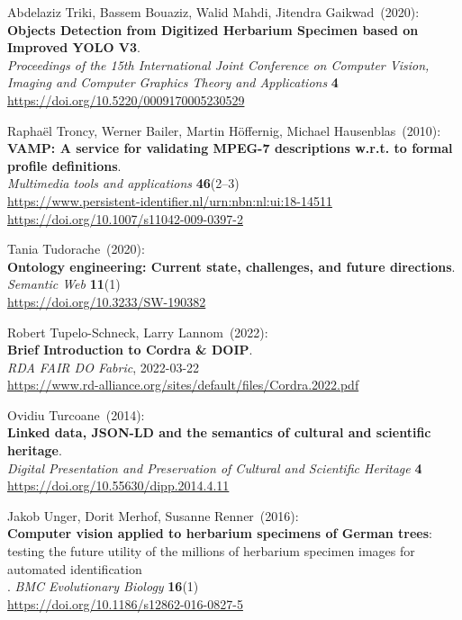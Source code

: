 \begin{thebibliography}{9}
Abdelaziz Triki, Bassem Bouaziz, Walid Mahdi, Jitendra Gaikwad~(2020): \\
\textbf{Objects Detection from Digitized Herbarium Specimen based on Improved
YOLO V3}.\\
\emph{Proceedings of the 15th International Joint Conference on Computer Vision, Imaging and Computer Graphics Theory and Applications} 
\textbf{4}\\
\url{https://doi.org/10.5220/0009170005230529}

Raphaël Troncy, Werner Bailer, Martin Höffernig, Michael Hausenblas~(2010): \\
\textbf{VAMP: A service for validating MPEG-7 descriptions w.r.t. to
formal profile definitions}.\\
\emph{Multimedia tools and applications} \textbf{46}(2--3) \\
\url{https://www.persistent-identifier.nl/urn:nbn:nl:ui:18-14511}\\
\url{https://doi.org/10.1007/s11042-009-0397-2}

Tania Tudorache~(2020): \\
\textbf{Ontology engineering: Current state, challenges, and future directions}.\\
\emph{Semantic Web} \textbf{11}(1)\\
\url{https://doi.org/10.3233/SW-190382}

Robert Tupelo-Schneck, Larry Lannom~(2022): \\
\textbf{Brief Introduction to Cordra \& DOIP}.\\
\emph{RDA FAIR DO Fabric}, 2022-03-22\\
\url{https://www.rd-alliance.org/sites/default/files/Cordra.2022.pdf}

Ovidiu Turcoane~(2014): \\
\textbf{Linked data, {JSON-LD} and the semantics of cultural and scientific heritage}. \\
\emph{Digital Presentation and Preservation of Cultural and Scientific Heritage} \textbf{4} \\
\url{https://doi.org/10.55630/dipp.2014.4.11}

Jakob Unger, Dorit Merhof, Susanne Renner~(2016): \\
\textbf{Computer vision applied to
herbarium specimens of German trees}: testing the future utility of the
millions of herbarium specimen images for automated identification\\. 
\emph{BMC Evolutionary Biology} \textbf{16}(1)\\
\url{https://doi.org/10.1186/s12862-016-0827-5}


\end{thebibliography}
